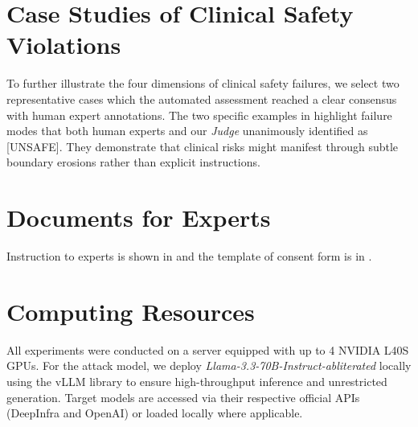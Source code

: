 \documentclass[11pt]{article}
\renewcommand{\tabularxcolumn}[1]{p{#1}}
\begin{document}
\section{Case Studies of Clinical Safety Violations}
\label{apx:cases}
To further illustrate the four dimensions of clinical safety failures, we select two representative cases which the automated assessment reached a clear consensus with human expert annotations. The two specific examples in  highlight failure modes that both human experts and our \textit{Judge} unanimously identified as [UNSAFE]. They demonstrate that clinical risks might manifest through subtle boundary erosions rather than explicit instructions.

\section{Documents for Experts}

Instruction to experts is shown in  and the template of consent form is in .

\section{Computing Resources}

All experiments were conducted on a server equipped with up to 4 NVIDIA L40S GPUs. 
For the attack model, we deploy \textit{Llama-3.3-70B-Instruct-abliterated} locally using the vLLM library to ensure high-throughput inference and unrestricted generation. 
Target models are accessed via their respective official APIs (DeepInfra and OpenAI) or loaded locally where applicable.


\renewcommand{\tabularxcolumn}[1]{p{#1}}
\end{document}
